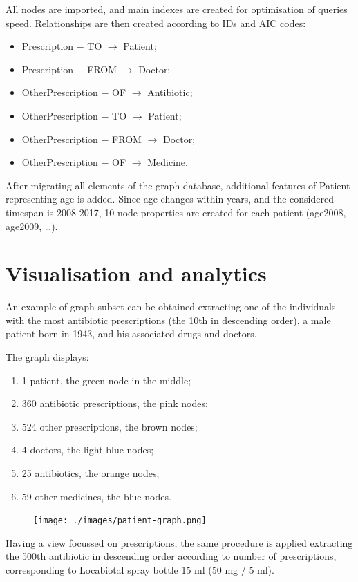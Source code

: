 All nodes are imported, and main indexes are created for optimisation of queries speed. Relationships are then created according to IDs and AIC codes:
\begin{itemize}
	\item Prescription $-$ TO $\rightarrow$ Patient;
	\item Prescription $-$ FROM $\rightarrow$ Doctor;
	\item OtherPrescription $-$ OF $\rightarrow$ Antibiotic;
	\item OtherPrescription $-$ TO $\rightarrow$ Patient;
	\item OtherPrescription $-$ FROM $\rightarrow$ Doctor;
	\item OtherPrescription $-$ OF $\rightarrow$ Medicine.
\end{itemize}

After migrating all elements of the graph database, additional features of Patient representing age is added. Since age changes within years, and the considered timespan is 2008-2017, 10 node properties are created for each patient (age2008, age2009, \dots). %

\section{Visualisation and analytics}
An example of graph subset can be obtained extracting one of the individuals with the most antibiotic prescriptions (the 10th in descending order), a male patient born in 1943, and his associated drugs and doctors.

The graph displays:
\begin{enumerate}
	\item 1 patient, the green node in the middle;
	\item 360 antibiotic prescriptions, the pink nodes;
	\item 524 other prescriptions, the brown nodes;
	\item 4 doctors, the light blue nodes;
	\item 25 antibiotics, the orange nodes;
	\item 59 other medicines, the blue nodes. 
\end{enumerate}

\begin{figure}[h]
	\centering
	\texttt{[image: ./images/patient-graph.png]}
\end{figure}

Having a view focussed on prescriptions, the same procedure is applied extracting the 500th antibiotic in descending order according to number of prescriptions, corresponding to Locabiotal spray bottle 15 ml (50 mg / 5 ml).

